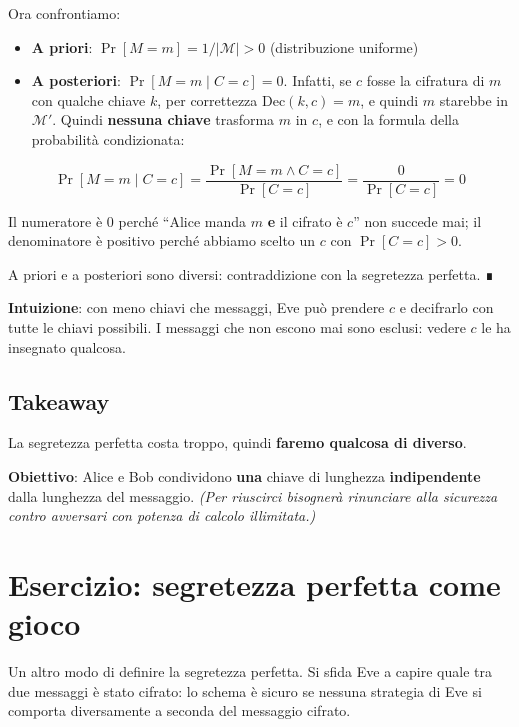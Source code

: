 Ora confrontiamo:

\begin{itemize}
\tightlist
\item
  \textbf{A priori}: \(\Pr[M = m] = 1/|\mathcal{M}| > 0\) (distribuzione uniforme)
\item
  \textbf{A posteriori}: \(\Pr[M = m \mid C = c] = 0\). Infatti, se \(c\) fosse la cifratura di \(m\) con qualche chiave \(k\), per correttezza \(\text{Dec}(k, c) = m\), e quindi \(m\) starebbe in \(\mathcal{M}'\). Quindi \textbf{nessuna chiave} trasforma \(m\) in \(c\), e con la formula della probabilità condizionata:
\end{itemize}

\[
\Pr[M = m \mid C = c] = \frac{\Pr[M = m \wedge C = c]}{\Pr[C = c]} = \frac{0}{\Pr[C = c]} = 0
\]

Il numeratore è 0 perché ``Alice manda \(m\) \textbf{e} il cifrato è \(c\)'' non succede mai; il denominatore è positivo perché abbiamo scelto un \(c\) con \(\Pr[C = c] > 0\).

A priori e a posteriori sono diversi: contraddizione con la segretezza perfetta. ∎

\textbf{Intuizione}: con meno chiavi che messaggi, Eve può prendere \(c\) e decifrarlo con tutte le chiavi possibili. I messaggi che non escono mai sono esclusi: vedere \(c\) le ha insegnato qualcosa.

\subsection{Takeaway}

La segretezza perfetta costa troppo, quindi \textbf{faremo qualcosa di diverso}.

\textbf{Obiettivo}: Alice e Bob condividono \textbf{una} chiave di lunghezza \textbf{indipendente} dalla lunghezza del messaggio. \emph{(Per riuscirci bisognerà rinunciare alla sicurezza contro avversari con potenza di calcolo illimitata.)}

\section{Esercizio: segretezza perfetta come gioco}

\begin{inbreve}

Un altro modo di definire la segretezza perfetta. Si sfida Eve a capire quale tra due messaggi è stato cifrato: lo schema è sicuro se nessuna strategia di Eve si comporta diversamente a seconda del messaggio cifrato.

\end{inbreve}

